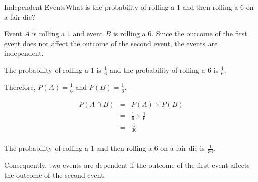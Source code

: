 \begin{wex}{Independent Events}{What is the probability of rolling a $1$ and then rolling a $6$ on a fair die?\\}{

Event $A$ is rolling a $1$ and event $B$ is rolling a $6$. Since the outcome of the first event does not affect the outcome of the second event, the events are independent.\\


The probability of rolling a $1$ is $\frac{1}{6}$ and the probability of rolling a $6$ is $\frac{1}{6}$.

Therefore, $P(A)=\frac{1}{6}$ and $P(B)=\frac{1}{6}$.\\


\begin{eqnarray*}
P(A \cap B) &=& P(A)\times P(B)\\
&=&\frac{1}{6} \times \frac{1}{6}\\
&=&\frac{1}{36}\\
\end{eqnarray*}

The probability of rolling a $1$ and then rolling a $6$ on a fair die is $\frac{1}{36}$.}
\end{wex}

Consequently, two events are dependent if the outcome of the first event affects the outcome of the second event.


